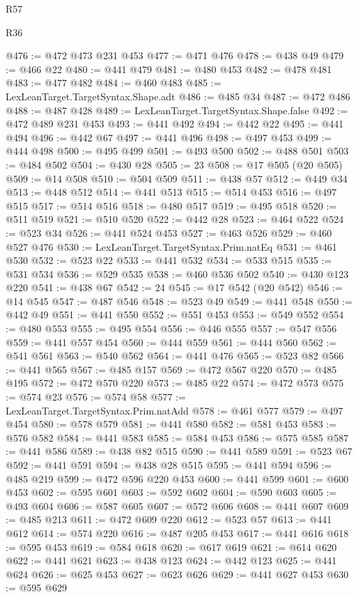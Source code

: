 \begin{lexlean}{R57}
\begin{lexlean}{R36}
\begin{coremodule}
{{{{{{{{{{{{{{{{{{{{{{{{{{{{{{{{{{{{{{{{{{{{{{{{{{{{{{{{{{{{{{{{{{{{{{{{{{{{{{{{{{@476 := @472 @473 @231 @453
@477 := @471 @476
@478 := @438 @49
@479 := @466 @22
@480 := @441 @479
@481 := @480 @453
@482 := @478 @481
@483 := @477 @482
@484 := @460 @483
@485 := LexLeanTarget.TargetSyntax.Shape.adt
@486 := @485 @34
@487 := @472 @486
@488 := @487 @428
@489 := LexLeanTarget.TargetSyntax.Shape.false
@492 := @472 @489 @231 @453
@493 := @441 @492
@494 := @442 @22
@495 := @441 @494
@496 := @442 @67
@497 := @441 @496
@498 := @497 @453
@499 := @444 @498
@500 := @495 @499
@501 := @493 @500
@502 := @488 @501
@503 := @484 @502
@504 := @430 @28
@505 := 23
@508 := @17 @505 (@20 @505)
@509 := @14 @508
@510 := @504 @509
@511 := @438 @57
@512 := @449 @34
@513 := @448 @512
@514 := @441 @513
@515 := @514 @453
@516 := @497 @515
@517 := @514 @516
@518 := @480 @517
@519 := @495 @518
@520 := @511 @519
@521 := @510 @520
@522 := @442 @28
@523 := @464 @522
@524 := @523 @34
@526 := @441 @524 @453
@527 := @463 @526
@529 := @460 @527 @476
@530 := LexLeanTarget.TargetSyntax.Prim.natEq
@531 := @461 @530
@532 := @523 @22
@533 := @441 @532
@534 := @533 @515
@535 := @531 @534
@536 := @529 @535
@538 := @460 @536 @502
@540 := @430 @123 @220
@541 := @438 @67
@542 := 24
@545 := @17 @542 (@20 @542)
@546 := @14 @545
@547 := @487 @546
@548 := @523 @49
@549 := @441 @548
@550 := @442 @49
@551 := @441 @550
@552 := @551 @453
@553 := @549 @552
@554 := @480 @553
@555 := @495 @554
@556 := @446 @555
@557 := @547 @556
@559 := @441 @557 @454
@560 := @444 @559
@561 := @444 @560
@562 := @541 @561
@563 := @540 @562
@564 := @441 @476
@565 := @523 @82
@566 := @441 @565
@567 := @485 @157
@569 := @472 @567 @220
@570 := @485 @195
@572 := @472 @570 @220
@573 := @485 @22
@574 := @472 @573
@575 := @574 @23
@576 := @574 @58
@577 := LexLeanTarget.TargetSyntax.Prim.natAdd
@578 := @461 @577
@579 := @497 @454
@580 := @578 @579
@581 := @441 @580
@582 := @581 @453
@583 := @576 @582
@584 := @441 @583
@585 := @584 @453
@586 := @575 @585
@587 := @441 @586
@589 := @438 @82 @515
@590 := @441 @589
@591 := @523 @67
@592 := @441 @591
@594 := @438 @28 @515
@595 := @441 @594
@596 := @485 @219
@599 := @472 @596 @220 @453
@600 := @441 @599
@601 := @600 @453
@602 := @595 @601
@603 := @592 @602
@604 := @590 @603
@605 := @493 @604
@606 := @587 @605
@607 := @572 @606
@608 := @441 @607
@609 := @485 @213
@611 := @472 @609 @220
@612 := @523 @57
@613 := @441 @612
@614 := @574 @220
@616 := @487 @205 @453
@617 := @441 @616
@618 := @595 @453
@619 := @584 @618
@620 := @617 @619
@621 := @614 @620
@622 := @441 @621
@623 := @438 @123
@624 := @442 @123
@625 := @441 @624
@626 := @625 @453
@627 := @623 @626
@629 := @441 @627 @453
@630 := @595 @629
}}}}}}}}}}}}}}}}}}}}}}}}}}}}}}}}}}}}}}}}}}}}}}}}}}}}}}}}}}}}}}}}}}}}}}}}}}}}}}}}}}
\end{coremodule}
\end{lexlean}
\end{lexlean}
